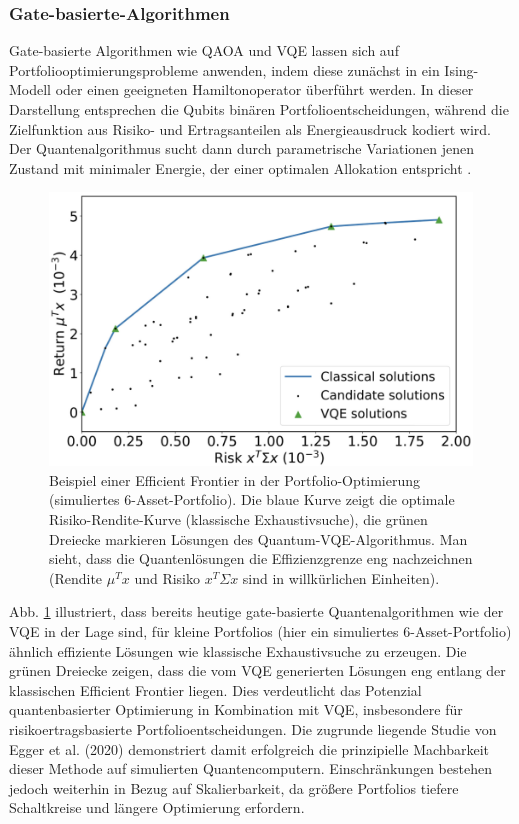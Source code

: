 \subsubsection*{Gate-basierte-Algorithmen}
 
Gate-basierte Algorithmen wie QAOA und VQE lassen sich auf Portfoliooptimierungsprobleme anwenden, indem diese zunächst in ein Ising-Modell oder einen geeigneten Hamiltonoperator überführt werden. In dieser Darstellung entsprechen die Qubits binären Portfolioentscheidungen, während die Zielfunktion aus Risiko- und Ertragsanteilen als Energieausdruck kodiert wird. Der Quantenalgorithmus sucht dann durch parametrische Variationen jenen Zustand mit minimaler Energie, der einer optimalen Allokation entspricht \cite{buonaiuto_best_2023, brandhofer_benchmarking_2022}.

\begin{figure}
    \centering
    \includegraphics[width=0.8\linewidth]{EfficientFrontier_VQE.png}
    \caption{Beispiel einer Efficient Frontier in der Portfolio-Optimierung (simuliertes 6-Asset-Portfolio). Die blaue Kurve zeigt die optimale Risiko-Rendite-Kurve (klassische Exhaustivsuche), die grünen Dreiecke markieren Lösungen des Quantum-VQE-Algorithmus. Man sieht, dass die Quantenlösungen die Effizienzgrenze eng nachzeichnen (Rendite $\mu^T x$ und Risiko $x^T \Sigma x$ sind in willkürlichen Einheiten). \cite[Abb. 8]{egger_quantum_2020}}
    \label{fig:efficient_frontier_vqe}
\end{figure}


Abb. \ref{fig:efficient_frontier_vqe} illustriert, dass bereits heutige gate-basierte Quantenalgorithmen wie der VQE in der Lage sind, für kleine Portfolios (hier ein simuliertes 6-Asset-Portfolio) ähnlich effiziente Lösungen wie klassische Exhaustivsuche zu erzeugen. Die grünen Dreiecke zeigen, dass die vom VQE generierten Lösungen eng entlang der klassischen Efficient Frontier liegen. Dies verdeutlicht das Potenzial quantenbasierter Optimierung in Kombination mit VQE, insbesondere für risikoertragsbasierte Portfolioentscheidungen. Die zugrunde liegende Studie von Egger et al. (2020) demonstriert damit erfolgreich die prinzipielle Machbarkeit dieser Methode auf simulierten Quantencomputern. Einschränkungen bestehen jedoch weiterhin in Bezug auf Skalierbarkeit, da größere Portfolios tiefere Schaltkreise und längere Optimierung erfordern.
 

